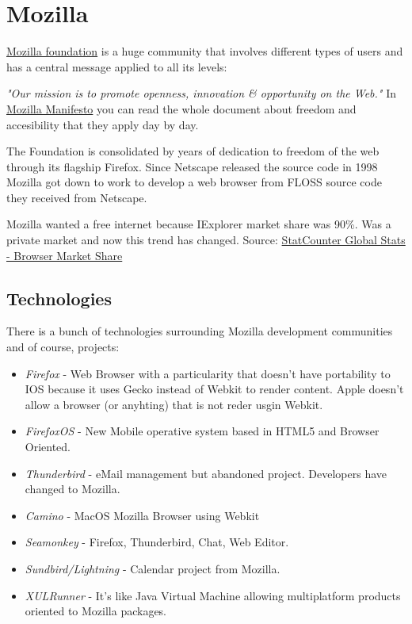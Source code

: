 \section{Mozilla}
\label{sec:mozilla}

\par \href{http://www.mozilla.org/}{Mozilla foundation} is a huge community that involves different types of users and has a central message applied to all its levels:

\par \textit{"Our mission is to promote openness, innovation \& opportunity on the Web."} In \href{http://www.mozilla.org/about/manifesto.html}{Mozilla Manifesto} you can read the whole document about freedom and accesibility that they apply day by day.

\par The Foundation is consolidated by years of dedication to freedom of the web through its flagship Firefox. Since Netscape released the source code in 1998 Mozilla got down to work to develop a web browser from FLOSS source code they received from Netscape.

\par Mozilla wanted a free internet because IExplorer market share was 90\%. Was a private market and now this trend has changed. Source: \href{http://gs.statcounter.com/#browser-ww-yearly-2008-2013}{StatCounter Global Stats - Browser Market Share}

\subsection{Technologies}

\par There is a bunch of technologies surrounding Mozilla development communities and of course, projects:

\begin{itemize}
	\item \textit{Firefox} - Web Browser with a particularity that doesn't have portability to IOS because it uses Gecko instead of Webkit to render content. Apple doesn't allow a browser (or anyhting) that is not reder usgin Webkit.
	\item \textit{FirefoxOS} - New Mobile operative system based in HTML5 and Browser Oriented.
	\item \textit{Thunderbird} - eMail management but abandoned project. Developers have changed to Mozilla.
	\item \textit{Camino} - MacOS Mozilla Browser using Webkit
	\item \textit{Seamonkey} - Firefox, Thunderbird, Chat, Web Editor.
	\item \textit{Sundbird/Lightning} - Calendar project from Mozilla.
	\item \textit{XULRunner} - It's like Java Virtual Machine allowing multiplatform products oriented to Mozilla packages.
\end{itemize}

